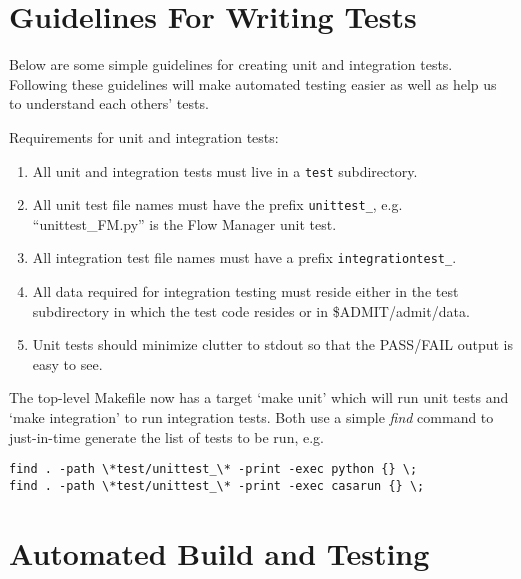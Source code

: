 \documentclass[10pt]{article}
\begin{document}
\section{Guidelines For Writing Tests}\label{s-guidelines}

Below are some simple guidelines for creating unit and integration tests.  
Following these guidelines will make automated testing easier as well 
as help us to understand each others' tests.

\noindent Requirements for unit and integration tests:
\begin{enumerate}
\item All unit and integration tests must live in a {\tt test} subdirectory.
\item All unit test file names must have the prefix {\tt unittest\_}, e.g. ``unittest\_FM.py'' is the Flow Manager unit test.
\item All integration test file names must have a prefix {\tt integrationtest\_}.
\item All data required for integration testing must reside either in
the test subdirectory in which the test code resides or in \$ADMIT/admit/data.
\item Unit tests should minimize clutter to stdout so that the PASS/FAIL output is easy to see.
\end{enumerate}

The top-level Makefile now has a target `make unit' which will run
unit tests and `make integration' to run integration tests.  Both use
a simple {\it find} command to just-in-time generate the list of tests to
be run, e.g.

\begin{verbatim}
find . -path \*test/unittest_\* -print -exec python {} \;
find . -path \*test/unittest_\* -print -exec casarun {} \;
\end{verbatim}


%
%
\section{Automated Build and Testing}\label{s-automated}
\end{document}
